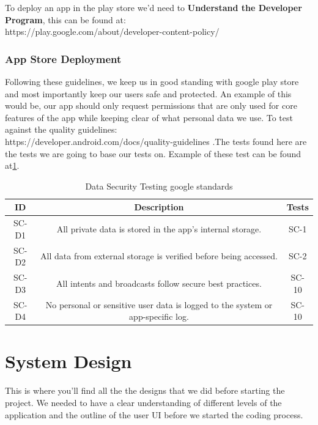 \documentclass[a4paper,12pt]{report}
\begin{document}
To deploy an app in the play store we'd need to
\textbf{Understand the Developer Program}, this can be found at:\\ https://play.google.com/about/developer-content-policy/
\subsection{App Store Deployment}
Following these guidelines, we keep us in good standing with google play store and most importantly keep our users safe and protected. An example of this would be, our app should only request permissions that are only used for core features of the app while keeping clear of what personal data we use. To test against the quality guidelines:\\ https://developer.android.com/docs/quality-guidelines .The tests found here are the tests we are going to base our tests on. Example of these test can be found at\ref{tab:SecurityTest}.


\begin{table}[h]
\begin{tabular}{||c c c||} 
 \hline
 \textbf{ID} & \textbf{Description} & \textbf{Tests} \\ [0.5ex] 
 \hline\hline
 SC-D1 & All private data is stored in the app's internal storage. & SC-1 \\ 
 \hline
 SC-D2 & All data from external storage is verified before being accessed. & SC-2 \\  
 \hline
 SC-D3 & All intents and broadcasts follow secure best practices. & SC-10 \\
 \hline
 SC-D4 & No personal or sensitive user data is logged to the system or app-specific log. & SC-10 \\
 \hline
\end{tabular}
\caption{Data Security Testing google standards}
\label{tab:SecurityTest}
\end{table}


\chapter{System Design}
This is where you’ll find all the the designs that we did before starting the project. We needed to have a clear understanding of different levels of the application and the outline of the user UI before we started the coding process.
\end{document}
